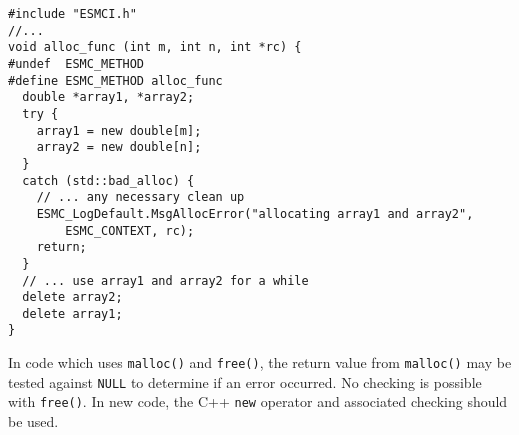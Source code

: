 \begin{verbatim}
#include "ESMCI.h"
//...
void alloc_func (int m, int n, int *rc) {
#undef  ESMC_METHOD
#define ESMC_METHOD alloc_func
  double *array1, *array2;
  try {
    array1 = new double[m];
    array2 = new double[n];
  }
  catch (std::bad_alloc) {
    // ... any necessary clean up
    ESMC_LogDefault.MsgAllocError("allocating array1 and array2",
        ESMC_CONTEXT, rc);
    return;
  }
  // ... use array1 and array2 for a while
  delete array2;
  delete array1;
}
\end{verbatim}

In code which uses {\tt malloc()} and {\tt free()},
the return value from {\tt malloc()} may be tested against
{\tt NULL} to determine if an error occurred.  No checking is
possible with {\tt free()}.  In new code, the C++ {\tt new}
operator and associated checking should be used.

